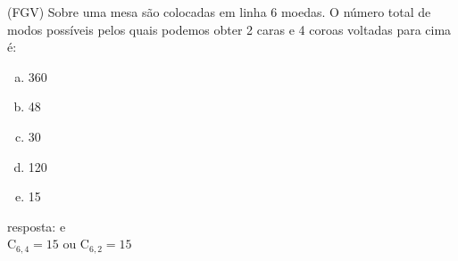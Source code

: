 \begin{ex}
(FGV) Sobre uma mesa são colocadas em linha 6 moedas. O número total de modos possíveis pelos quais podemos obter 2 caras e 4 coroas voltadas para cima é:
   \begin{enumerate}[(a)]
   \item 360
   \item 48
   \item 30
   \item 120
   \item 15
   \end{enumerate}
     \begin{sol}
       resposta: e \\
       $\mathrm{C}_{6,4}=15$ ou $\mathrm{C}_{6,2}=15$
     \end{sol}
\end{ex}